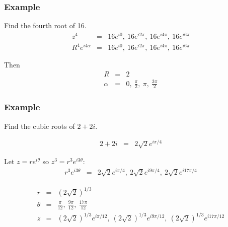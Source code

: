 \begin{frame}
  \frametitle{Example}

  Find the fourth root of 16.
  \begin{eqnarray*}
    z^4 & = & 16 e^{i0}, ~ 16 e^{i2\pi}, ~ 16 e^{i4\pi}, ~ 16 e^{i6\pi} \\
    R^4 e^{i4\alpha} & = & 16 e^{i0}, ~ 16 e^{i2\pi}, ~ 16 e^{i4\pi}, ~ 16 e^{i6\pi}
  \end{eqnarray*}

  Then
  \begin{eqnarray*}
    R & = & 2 \\
    \alpha & = & 0, ~ \frac{\pi}{2}, ~ \pi, ~ \frac{3\pi}{2}
  \end{eqnarray*}

\end{frame}



\begin{frame}
  \frametitle{Example}

  Find the cubic roots of $2+2i$.

  \begin{eqnarray*}
    2 + 2i & = & 2\sqrt{2} e^{i\pi/4}
  \end{eqnarray*}

  Let $z=re^{i\theta}$ so $z^3=r^3e^{i3\theta}$:
  \begin{eqnarray*}
    r^3e^{i3\theta} & = & 2\sqrt{2} e^{i\pi/4}, ~ 2\sqrt{2} e^{i9\pi/4}, ~ 2\sqrt{2} e^{i17\pi/4}
  \end{eqnarray*}

  \begin{eqnarray*}
    r & = & (2\sqrt{2})^{1/3} \\
    \theta & = & \frac{\pi}{12}, ~ \frac{9\pi}{12}, ~ \frac{17\pi}{12} \\
    z & = & (2\sqrt{2})^{1/3} e^{i\pi/12}, ~ (2\sqrt{2})^{1/3} e^{i9\pi/12}, ~ (2\sqrt{2})^{1/3} e^{i17\pi/12}
  \end{eqnarray*}

\end{frame}



